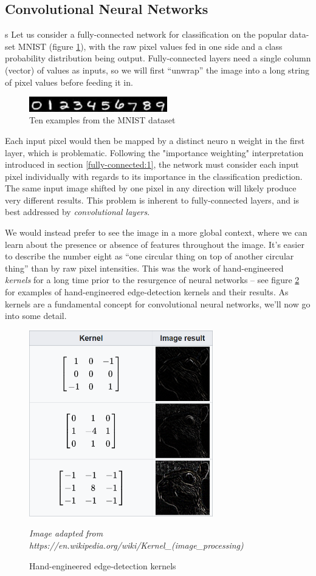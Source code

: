 \documentclass{report}
\begin{document}
	\subsection{Convolutional Neural Networks} \label{cnn:1}s
	Let us consider a fully-connected network for classification on the popular data-set MNIST (figure \ref{fig:mnist:1}), with the raw pixel values fed in one side and a class probability distribution being output. Fully-connected layers need a single column (vector) of values as inputs, so we will first ``unwrap'' the image into a long string of pixel values before feeding it in. \par
	\begin{figure}[h]
		\centering
		\includegraphics[width=6cm]{mnist}
		\caption{Ten examples from the MNIST dataset}
		\label{fig:mnist:1}
	\end{figure}
	Each input pixel would then be mapped by a distinct neuro  n weight in the first layer, which is problematic. Following the "importance weighting" interpretation introduced in section \ref{fully-connected:1}, the network must consider each input pixel individually with regards to its importance in the classification prediction. The same input image shifted by one pixel in any direction will likely produce very different results. This problem is inherent to fully-connected layers, and is best addressed by \textit{convolutional layers}. \par
	We would instead prefer to see the image in a more global context, where we can learn about the presence or absence of features throughout the image. It's easier to describe the number eight as ``one circular thing on top of another circular thing'' than by raw pixel intensities. This was the work of hand-engineered \textit{kernels} for a long time prior to the resurgence of neural networks -- see figure \ref{fig:hand-eng-kernels:1} for examples of hand-engineered edge-detection kernels and their results. As kernels are a fundamental concept for convolutional neural networks, we'll now go into some detail. \par
	\begin{figure}[!h]
		\centering
		\includegraphics[width=8cm]{handengkernels}
		\caption{Hand-engineered edge-detection kernels}
		\label{fig:hand-eng-kernels:1}
		\textit{Image adapted from https://en.wikipedia.org/wiki/Kernel\_(image\_processing)}
	\end{figure}
\end{document}
